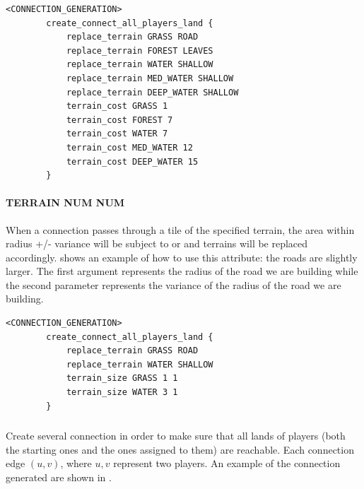 \begin{appendices}
    \begin{lstlisting}[language={rms},label={lst:replacecost}]
        <CONNECTION_GENERATION>
        create_connect_all_players_land {
            replace_terrain GRASS ROAD
            replace_terrain FOREST LEAVES
            replace_terrain WATER SHALLOW
            replace_terrain MED_WATER SHALLOW
            replace_terrain DEEP_WATER SHALLOW
            terrain_cost GRASS 1
            terrain_cost FOREST 7
            terrain_cost WATER 7
            terrain_cost MED_WATER 12
            terrain_cost DEEP_WATER 15
        }
    \end{lstlisting}

    \paragraph{ TERRAIN NUM NUM}

    When a connection passes through a tile of the specified terrain, the area within radius +/- variance will be subject to  or  and terrains will be replaced accordingly.  shows an example of how to use this attribute: the roads are slightly larger. The first argument represents the radius of the road we are building while the second parameter represents the variance of the radius of the road we are building.

    \begin{lstlisting}[language={rms},label={lst:terrainsize}]
        <CONNECTION_GENERATION>
        create_connect_all_players_land {
            replace_terrain GRASS ROAD
            replace_terrain WATER SHALLOW
            terrain_size GRASS 1 1
            terrain_size WATER 3 1
        }
    \end{lstlisting}

    \subsubsection{}

    Create several connection in order to make sure that all lands of players (both the starting ones and the ones assigned to them) are reachable. Each connection edge $(u,v)$, where $u,v$ represent two players. An example of the connection generated are shown in .

    \begin{figure}[ht]
        \centering
        \begin{tikzpicture}


\end{tikzpicture}
\end{figure}
\end{appendices}
